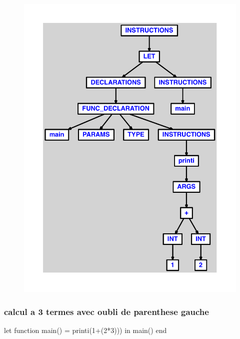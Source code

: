 \documentclass{article}
\begin{document}
\begin{figure}[H]\centering\includegraphics[max width=\textwidth]{ast/ast_28.pdf}\end{figure}\subsubsection{calcul a 3 termes avec oubli de parenthese gauche}
\begin{verbatimtab}
let function main() = printi(1+(2*3))) in main() end
\end{verbatimtab}
\end{document}
